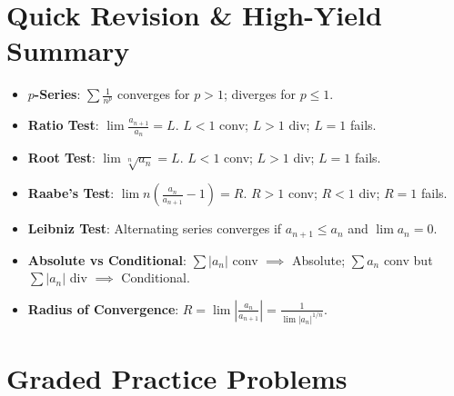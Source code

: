 \section{Quick Revision \& High-Yield Summary}

\begin{quickrevision}
\begin{itemize}
    \item \textbf{$p$-Series}: $\sum \frac{1}{n^p}$ converges for $p > 1$; diverges for $p \le 1$.
    \item \textbf{Ratio Test}: $\lim \frac{a_{n+1}}{a_n} = L$. $L < 1$ conv; $L > 1$ div; $L = 1$ fails.
    \item \textbf{Root Test}: $\lim \sqrt[n]{a_n} = L$. $L < 1$ conv; $L > 1$ div; $L = 1$ fails.
    \item \textbf{Raabe's Test}: $\lim n\left(\frac{a_n}{a_{n+1}}-1\right) = R$. $R > 1$ conv; $R < 1$ div; $R = 1$ fails.
    \item \textbf{Leibniz Test}: Alternating series converges if $a_{n+1} \le a_n$ and $\lim a_n = 0$.
    \item \textbf{Absolute vs Conditional}: $\sum |a_n|$ conv $\implies$ Absolute; $\sum a_n$ conv but $\sum |a_n|$ div $\implies$ Conditional.
    \item \textbf{Radius of Convergence}: $R = \lim |\frac{a_n}{a_{n+1}}| = \frac{1}{\lim |a_n|^{1/n}}$.
\end{itemize}
\end{quickrevision}

\section{Graded Practice Problems}

